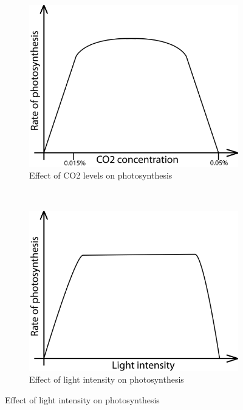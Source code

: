 \begin{figure}
        \centering
        \begin{subfigure}[b]{0.45\textwidth}
                \includegraphics[width=\textwidth]{img/photosynthesis/co2.png}
                \caption{Effect of CO2 levels on photosynthesis}
                \label{fig:co2levels}
        \end{subfigure}
        ~~
        \begin{subfigure}[b]{0.45\textwidth}
                \includegraphics[width=\textwidth]{img/photosynthesis/light_intensity.png}
                \caption{Effect of light intensity on photosynthesis}
                \label{fig:lightintensity}
        \end{subfigure}
       
\end{figure}

